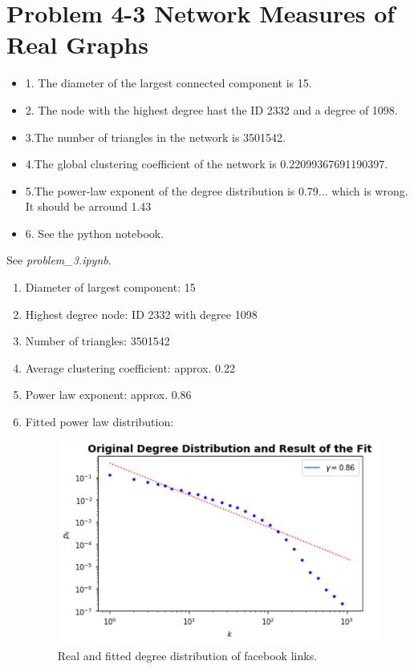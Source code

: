 \section{Problem 4-3 Network Measures of Real Graphs}
\begin{itemize}
\item 1. The diameter of the largest connected component is 15.
\item 2. The node with the highest degree hast the ID 2332 and a degree of 1098.
\item 3.The number of triangles in the network is 3501542.
\item 4.The global clustering coefficient of the network is 0.22099367691190397.
\item 5.The power-law exponent of the degree distribution is 0.79...  which is wrong.  It should be arround 1.43
\item 6.  See the python notebook.
\end{itemize}
See \textit{problem\_3.ipynb}.

\begin{enumerate}
	\item Diameter of largest component: 15
	\item Highest degree node: ID 2332 with degree 1098
	\item Number of triangles: 3501542
	\item Average clustering coefficient: approx. 0.22
	\item Power law exponent: approx. 0.86
	\item Fitted power law distribution:
	
	\begin{figure}[h]
		\centering
		\includegraphics[width=0.9\linewidth]{images/problem43_degree_distribution.png}
		\caption{Real and fitted degree distribution of facebook links.}
		\label{distribution}
	\end{figure}
\end{enumerate}
